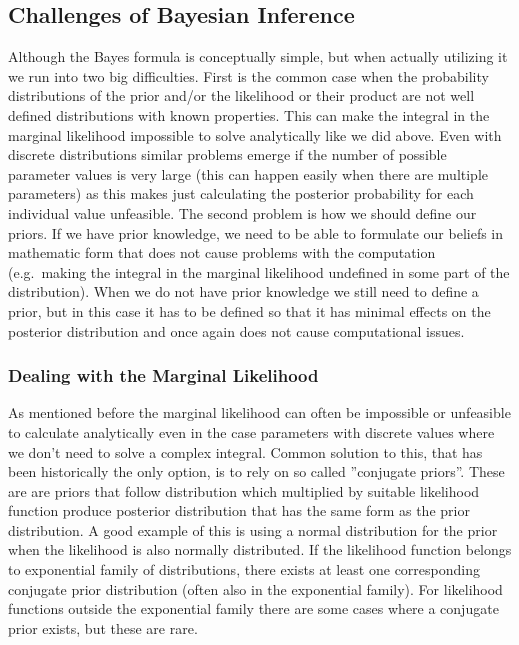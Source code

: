 \documentclass[12pt,a4paper,leqno]{report}
\theoremstyle{plain}
\theoremstyle{definition}
\theoremstyle{remark}
\begin{document}
\subsection{Challenges of Bayesian Inference}\label{bayesproblems}

Although the Bayes formula is conceptually simple, but when actually utilizing it we run
into two big difficulties. First is the common case when the probability distributions of
the prior and/or the likelihood or their product are not well defined distributions with
known properties. This can make the integral in the marginal likelihood impossible to
solve analytically like we did above. Even with discrete distributions similar problems
emerge if the number of possible parameter values is very large (this can happen easily
when there are multiple parameters) as this makes just calculating the posterior
probability for each individual value unfeasible. The second problem is how we should
define our priors. If we have prior knowledge, we need to be able to formulate our
beliefs in mathematic form that does not cause problems with the computation (e.g.\
making the integral in the marginal likelihood undefined in some part of the
distribution). When we do not have prior knowledge we still need to define a prior, but
in this case it has to be defined so that it has minimal effects on the posterior
distribution and once again does not cause computational issues.

\subsubsection{Dealing with the Marginal Likelihood}\label{bayesproblems}

As mentioned before the marginal likelihood can often be impossible or unfeasible to
calculate analytically even in the case parameters with discrete values where we don't
need to solve a complex integral. Common solution to this, that has been historically the
only option, is to rely on so called ''conjugate priors''. These are are priors that
follow distribution which multiplied by suitable likelihood function produce posterior
distribution that has the same form as the prior distribution. A good example of this is
using a normal distribution for the prior when the likelihood is also normally
distributed. If the likelihood function belongs to exponential family of distributions,
there exists at least one corresponding conjugate prior distribution (often also in the
exponential family). For likelihood functions outside the exponential family there are
some cases where a conjugate prior exists, but these are rare.
\end{document}
